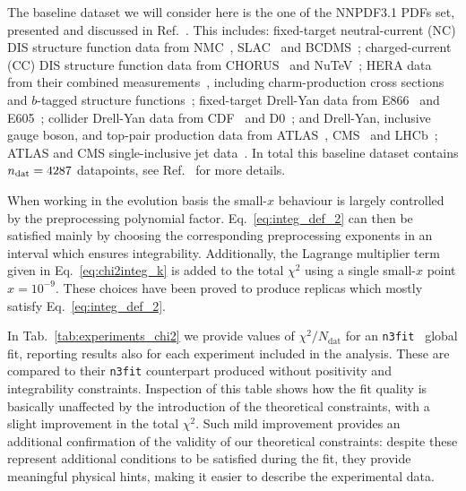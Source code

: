 %
The baseline dataset we will consider here is the one of the NNPDF3.1 PDFs set, presented and discussed in Ref.~\cite{Ball:2017nwa}.
This includes: fixed-target neutral-current 
(NC) DIS structure function data from NMC~\cite{Arneodo:1996kd,Arneodo:1996qe}, 
SLAC~\cite{Whitlow:1991uw} and BCDMS~\cite{Benvenuti:1989rh}; charged-current 
(CC) DIS structure function data from CHORUS~\cite{Onengut:2005kv} and 
NuTeV~\cite{Goncharov:2001qe,Mason:2006qa}; HERA data from their combined 
measurements~\cite{Abramowicz:2015mha}, including charm-production cross 
sections~\cite{Abramowicz:1900rp} and $b$-tagged structure 
functions~\cite{Aaron:2009af,Abramowicz:2014zub}; fixed-target Drell-Yan data 
from E866~\cite{Webb:2003ps,Webb:2003bj,Towell:2001nh} and 
E605~\cite{Moreno:1990sf}; collider Drell-Yan data from 
CDF~\cite{Aaltonen:2010zza} and D0~\cite{Abazov:2007jy,
Abazov:2013rja,D0:2014kma}; and Drell-Yan, inclusive gauge boson, and top-pair
production data from 
ATLAS~\cite{Aad:2013iua,Aad:2014qja,Aad:2011dm,Aaboud:2016btc,Aad:2015auj,
Aad:2014kva,Aaboud:2016pbd,Aad:2015mbv}, CMS~\cite{Chatrchyan:2012xt,
Chatrchyan:2013mza,Chatrchyan:2013tia,Khachatryan:2016pev,Khachatryan:2015oaa,
Khachatryan:2016mqs,Khachatryan:2015uqb,Khachatryan:2015oqa} 
and LHCb~\cite{Aaij:2012vn,Aaij:2012mda,Aaij:2015gna,Aaij:2015zlq};
ATLAS and CMS single-inclusive jet data~\cite{Aad:2014vwa, Khachatryan:2015luy}.
In total this baseline dataset contains $n_{\rm dat}=4287$
datapoints, see Ref.~\cite{Ball:2017nwa} for more details.

%
When working in the evolution basis the small-$x$ behaviour is largely controlled by the preprocessing
polynomial factor. Eq.~\eqref{eq:integ_def_2}
can then be satisfied mainly by choosing the corresponding preprocessing exponents in an interval which ensures integrability.
Additionally, the Lagrange multiplier term given in Eq.~\eqref{eq:chi2integ_k} is added to the
total $\chi^2$ using a single small-$x$ point $x=10^{-9}$. These choices have been proved to
produce replicas which mostly satisfy Eq.~\eqref{eq:integ_def_2}. 

%
In Tab.~\ref{tab:experiments_chi2} we provide values of $\chi^2/N_{\text{dat}}$ for an {\tt n3fit } global fit,
reporting results also for each experiment included in the analysis.
These are compared to their {\tt n3fit} counterpart produced without positivity and integrability constraints. 
Inspection of this table shows how the fit quality is basically unaffected by the introduction of the
theoretical constraints, with a slight improvement in the total $\chi^2$. Such mild improvement provides an
additional confirmation of the validity of our theoretical constraints: despite these represent additional 
conditions to be satisfied during the fit, they provide meaningful physical hints, making it easier to describe 
the experimental data.
 
